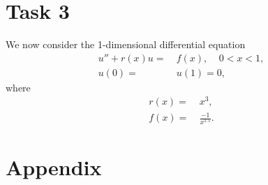 \documentclass[a4paper,11pt]{article}
\newcommand{\ba}[1]{\begin{align*}    #1    \end{align*}}
\begin{document}
\section*{Task 3}

We now consider the 1-dimensional differential equation
\ba{
u'' + r(x)u = & \ f(x), \ \ \ \ \ 0<x<1,\\
u(0) = & \  u(1) = 0,
}
where
\ba{
r(x) = & \ x^3,\\
f(x) = & \ \frac{-1}{x^{1.5}}.
}


\section*{Appendix}
\begin{lstlisting}[style=customc]
\end{lstlisting}
\end{document}
